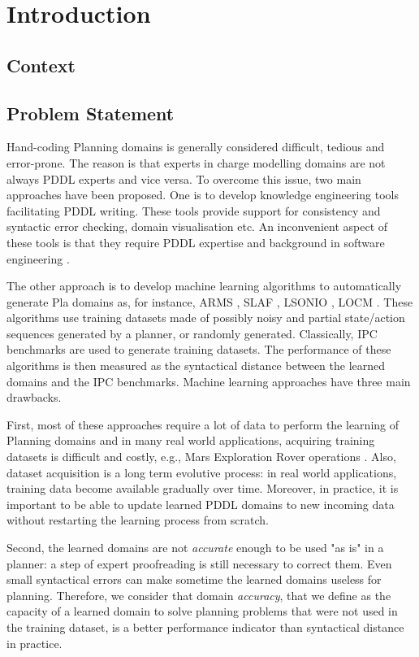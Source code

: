 \chapter{Introduction}
\minitoc

\section{Context}

\section{Problem Statement}

Hand-coding Planning domains is generally considered difficult, tedious and error-prone. The reason is that experts in charge modelling domains are not always PDDL experts and vice versa. To overcome this issue, two main approaches have been proposed. One is to develop knowledge engineering tools facilitating PDDL writing. These tools provide support for consistency and syntactic error checking, domain visualisation etc. An inconvenient aspect of these tools is that they require PDDL expertise and background in software engineering \cite{shah2013knowledge}.

The other approach is to develop machine learning algorithms to automatically generate Pla domains as, for instance, ARMS \cite{arms}, SLAF \cite{slaf}, LSONIO \cite{lsonio}, LOCM \cite{locm}. These algorithms use training datasets made of possibly noisy and partial state/action sequences generated by a planner, or randomly generated. Classically, IPC benchmarks are used to generate training datasets. The performance of these algorithms is  then measured as the syntactical distance between the learned domains and the IPC benchmarks. Machine learning approaches have three main drawbacks.

First, most of these approaches require a lot of data to perform the learning of Planning domains and in many real world applications, acquiring training datasets is difficult and costly, e.g., Mars Exploration Rover operations \cite{bresina}. Also, dataset acquisition is a long term evolutive process: in real world applications, training data become available gradually over time. Moreover, in practice, it is important to be able to update learned PDDL domains to new incoming data without restarting the learning process from scratch.

Second, the learned domains are not {\em accurate} enough to be used "as is" in a planner: a step of expert proofreading is still necessary to correct them. Even small syntactical errors can make sometime the learned domains useless for planning. Therefore, we consider that domain {\em accuracy}, that we define as the capacity of a learned domain to solve planning problems that were not used in the training dataset, is a better performance indicator than syntactical distance in practice.


